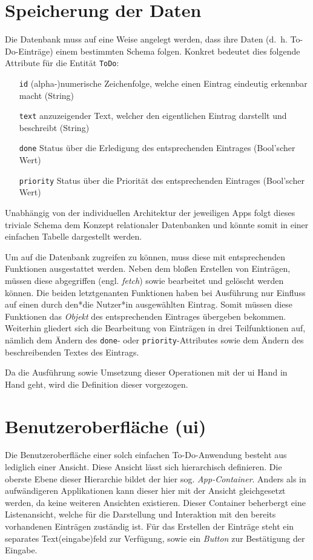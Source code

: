 \section{Speicherung der Daten}
Die Datenbank muss auf eine Weise angelegt werden, dass ihre Daten (d.\ h. To-Do-Einträge) einem bestimmten Schema folgen. Konkret bedeutet dies folgende Attribute für die Entität \texttt{ToDo}:

\begin{itemize}
	\item[\texttt{id}] (alpha-)numerische Zeichenfolge, welche einen Eintrag eindeutig erkennbar macht (String)
	\item[\texttt{text}] anzuzeigender Text, welcher den eigentlichen Eintrag darstellt und beschreibt (String)
	\item[\texttt{done}] Status über die Erledigung des entsprechenden Eintrages (Bool'scher Wert)
	\item[\texttt{priority}] Status über die Priorität des entsprechenden Eintrages (Bool'scher Wert)
\end{itemize}

Unabhängig von der individuellen Architektur der jeweiligen Apps folgt dieses triviale Schema dem Konzept relationaler Datenbanken und könnte somit in einer einfachen Tabelle dargestellt werden.

Um auf die Datenbank zugreifen zu können, muss diese mit entsprechenden Funktionen ausgestattet werden. Neben dem bloßen Erstellen von Einträgen, müssen diese abgegriffen (engl. \textit{fetch}) sowie bearbeitet und gelöscht werden können. Die beiden letztgenanten Funktionen haben bei Ausführung nur Einfluss auf einen durch den*die Nutzer*in ausgewählten Eintrag. Somit müssen diese Funktionen das \textit{Objekt} des entsprechenden Eintrages übergeben bekommen. Weiterhin gliedert sich die Bearbeitung von Einträgen in drei Teilfunktionen auf, nämlich dem Ändern des \texttt{done}- oder \texttt{priority}-Attributes sowie dem Ändern des beschreibenden Textes des Eintrags.

Da die Ausführung sowie Umsetzung dieser Operationen mit der \ac{ui} Hand in Hand geht, wird die Definition dieser vorgezogen.

\section{Benutzeroberfläche (\ac{ui})}
Die Benutzeroberfläche einer solch einfachen To-Do-Anwendung besteht aus lediglich einer Ansicht. Diese Ansicht lässt sich hierarchisch definieren. Die oberste Ebene dieser Hierarchie bildet der hier sog. \textit{App-Container}. Anders als in aufwändigeren Applikationen kann dieser hier mit der Ansicht gleichgesetzt werden, da keine weiteren Ansichten existieren. Dieser Container beherbergt eine Listenansicht, welche für die Darstellung und Interaktion mit den bereits vorhandenen Einträgen zuständig ist. Für das Erstellen der Einträge steht ein separates Text(eingabe)feld zur Verfügung, sowie ein \textit{Button} zur Bestätigung der Eingabe.

